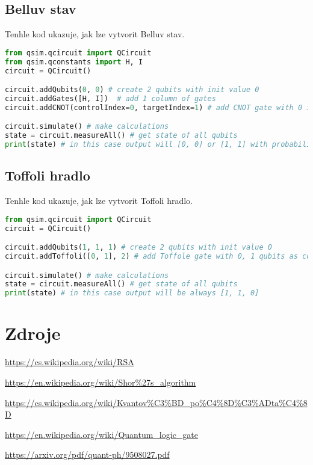 \documentclass[12pt]{article}
\begin{document}
\subsection{Belluv stav}
Tenhle kod ukazuje, jak lze vytvorit Belluv stav.
\begin{lstlisting}[language=Python, caption=Bell state]
from qsim.qcircuit import QCircuit
from qsim.qconstants import H, I
circuit = QCircuit()

circuit.addQubits(0, 0) # create 2 qubits with init value 0
circuit.addGates([H, I])  # add 1 column of gates
circuit.addCNOT(controlIndex=0, targetIndex=1) # add CNOT gate with 0 index qubit as control and 1 index as target

circuit.simulate() # make calculations
state = circuit.measureAll() # get state of all qubits
print(state) # in this case output will [0, 0] or [1, 1] with probability of 0.5
\end{lstlisting}

\subsection{Toffoli hradlo}
Tenhle kod ukazuje, jak lze vytvorit Toffoli hradlo.
\begin{lstlisting}[language=Python, caption=Toffoli gate]
from qsim.qcircuit import QCircuit
circuit = QCircuit()

circuit.addQubits(1, 1, 1) # create 2 qubits with init value 0
circuit.addToffoli([0, 1], 2) # add Toffole gate with 0, 1 qubits as control and 2 qubit as target

circuit.simulate() # make calculations
state = circuit.measureAll() # get state of all qubits
print(state) # in this case output will be always [1, 1, 0]
\end{lstlisting}

\newpage


\section{Zdroje}
\color{blue}
\fontsize{10pt}{0}
\url{https://cs.wikipedia.org/wiki/RSA}
\par\url{https://en.wikipedia.org/wiki/Shor%27s_algorithm}
\par\url{https://cs.wikipedia.org/wiki/Kvantov%C3%BD_po%C4%8D%C3%ADta%C4%8D}
\par\url{https://en.wikipedia.org/wiki/Quantum_logic_gate}
\par\url{https://arxiv.org/pdf/quant-ph/9508027.pdf}
\end{document}
